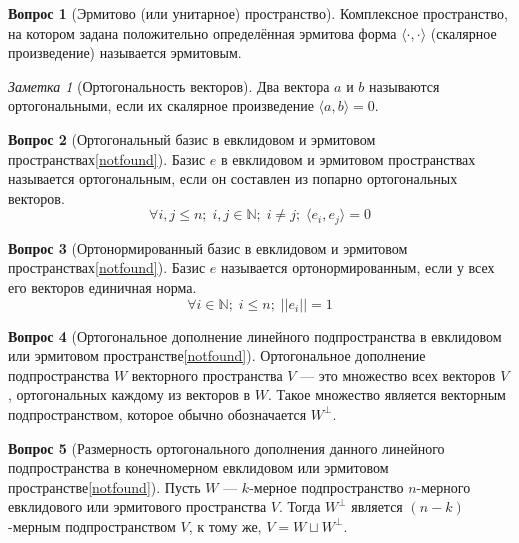 \documentclass[a4paper,11pt]{article}
\theoremstyle{remark}
\newtheorem*{note}{Заметка}
\theoremstyle{definition}
\newtheorem{question}{Вопрос}
\begin{document}
\begin{question}[Эрмитово (или унитарное) пространство]
Комплексное пространство, на котором задана положительно определённая эрмитова форма \(\langle \cdot , \cdot \rangle\) (скалярное произведение) называется эрмитовым. 
\end{question}

\begin{note}[Ортогональность векторов]
Два вектора \(a\) и \(b\) называются ортогональными, если их скалярное произведение \(\langle a , b \rangle = 0\).
\end{note}

\begin{question}[Ортогональный базис в евклидовом и эрмитовом пространствах\cref{notfound}]
Базис \(e\) в евклидовом и эрмитовом пространствах называется ортогональным, если он составлен из попарно ортогональных векторов.
\begin{equation*}
	\forall i,j \leqslant n;\; i, j \in \mathbb{N};\; i \neq j;\; \langle e_i, e_j \rangle = 0
\end{equation*}
\end{question}


\begin{question}[Ортонормированный базис в евклидовом и эрмитовом пространствах\cref{notfound}]
Базис \(e\) называется ортонормированным, если у всех его векторов единичная норма.
\begin{equation*}
	\forall i \in \mathbb{N};\; i \leqslant n;\; ||e_i|| = 1
\end{equation*}
\end{question}


\begin{question}[Ортогональное дополнение линейного подпространства в евклидовом или эрмитовом пространстве\cref{notfound}]
Ортогональное дополнение подпространства \(W\) векторного пространства \(V\) --- это множество всех векторов \(V\), ортогональных каждому из векторов в \(W\). Такое множество является векторным подпространством, которое обычно обозначается \(W^{\bot}\).
\end{question}


\begin{question}[Размерность ортогонального дополнения данного линейного подпространства в конечномерном евклидовом или эрмитовом пространстве\cref{notfound}]
Пусть \(W\) --- \(k\)-мерное подпространство \(n\)-мерного евклидового или эрмитового пространства \(V\). Тогда \(W^{\bot}\) является \((n\!-\!k)\)-мерным подпространством \(V\), к тому же, \(V = W \sqcup W^{\bot}\).
\end{question}
\end{document}
